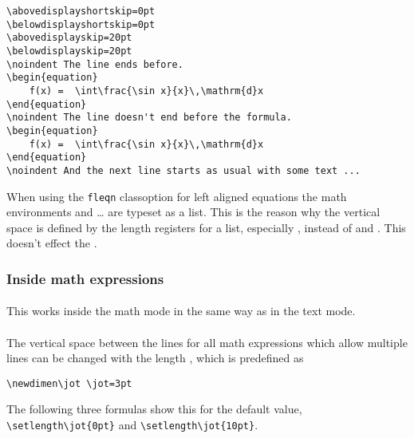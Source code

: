 \begin{table}[htb]
\medskip
\begin{lstlisting}
\abovedisplayshortskip=0pt
\belowdisplayshortskip=0pt
\abovedisplayskip=20pt
\belowdisplayskip=20pt
\noindent The line ends before.
\begin{equation}
	f(x) =  \int\frac{\sin x}{x}\,\mathrm{d}x
\end{equation}
\noindent The line doesn't end before the formula.
\begin{equation}
	f(x) =  \int\frac{\sin x}{x}\,\mathrm{d}x
\end{equation}
\noindent And the next line starts as usual with some text ...
\end{lstlisting}


%
When using the \verb+fleqn+ classoption for left
aligned equations the math environments  
and \CIndex{[}\ldots\CIndex{]} are typeset as a list. This is the reason why the
vertical space is defined by the length registers for a list, especially
, instead of  and .
This doesn't effect the . 


\subsubsection{Inside math expressions}\label{subsec:vspacing}

\paragraph{\CMD{\textbackslash [<length>]}}
This works inside the math mode in the same way as in the text mode.


\paragraph{}
The vertical space between the lines for all math expressions which allow multiple
lines  can be changed with the length , which is predefined as

\begin{verbatim}
\newdimen\jot \jot=3pt
\end{verbatim}

The following three formulas show this for the default value, \verb|\setlength\jot{0pt}|  
and \verb|\setlength\jot{10pt}|.


\end{table}
